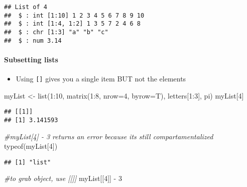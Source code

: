\documentclass[
]{article}
\newenvironment{Shaded}{\begin{snugshade}}{\end{snugshade}}
\newcommand{\AttributeTok}[1]{\textcolor[rgb]{0.77,0.63,0.00}{#1}}
\newcommand{\CommentTok}[1]{\textcolor[rgb]{0.56,0.35,0.01}{\textit{#1}}}
\newcommand{\DecValTok}[1]{\textcolor[rgb]{0.00,0.00,0.81}{#1}}
\newcommand{\FunctionTok}[1]{\textcolor[rgb]{0.00,0.00,0.00}{#1}}
\newcommand{\NormalTok}[1]{#1}
\newcommand{\OtherTok}[1]{\textcolor[rgb]{0.56,0.35,0.01}{#1}}
\newcommand{\SpecialCharTok}[1]{\textcolor[rgb]{0.00,0.00,0.00}{#1}}
\providecommand{\tightlist}{%
  \setlength{\itemsep}{0pt}\setlength{\parskip}{0pt}}
\begin{document}
\begin{verbatim}
## List of 4
##  $ : int [1:10] 1 2 3 4 5 6 7 8 9 10
##  $ : int [1:4, 1:2] 1 3 5 7 2 4 6 8
##  $ : chr [1:3] "a" "b" "c"
##  $ : num 3.14
\end{verbatim}

\hypertarget{subsetting-lists}{%
\paragraph{Subsetting lists}\label{subsetting-lists}}

\begin{itemize}
\tightlist
\item
  Using \texttt{{[}{]}} gives you a single item BUT not the elements
\end{itemize}

\begin{Shaded}
\begin{Highlighting}[]
\NormalTok{myList }\OtherTok{\textless{}{-}} \FunctionTok{list}\NormalTok{(}\DecValTok{1}\SpecialCharTok{:}\DecValTok{10}\NormalTok{, }\FunctionTok{matrix}\NormalTok{(}\DecValTok{1}\SpecialCharTok{:}\DecValTok{8}\NormalTok{, }\AttributeTok{nrow=}\DecValTok{4}\NormalTok{, }\AttributeTok{byrow=}\NormalTok{T), letters[}\DecValTok{1}\SpecialCharTok{:}\DecValTok{3}\NormalTok{], pi)}
\NormalTok{myList[}\DecValTok{4}\NormalTok{]}
\end{Highlighting}
\end{Shaded}

\begin{verbatim}
## [[1]]
## [1] 3.141593
\end{verbatim}

\begin{Shaded}
\begin{Highlighting}[]
\CommentTok{\#myList[4] {-} 3 returns an error because it\textquotesingle{}s still compartamentalized}
\FunctionTok{typeof}\NormalTok{(myList[}\DecValTok{4}\NormalTok{])}
\end{Highlighting}
\end{Shaded}

\begin{verbatim}
## [1] "list"
\end{verbatim}

\begin{Shaded}
\begin{Highlighting}[]
\CommentTok{\#to grab object, use [[]]}
\NormalTok{myList[[}\DecValTok{4}\NormalTok{]] }\SpecialCharTok{{-}} \DecValTok{3}
\end{Highlighting}
\end{Shaded}
\end{document}
